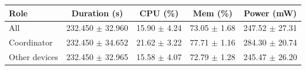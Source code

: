 \begin{tabular}{lcccc}
\hline
\textbf{Role} & \textbf{Duration (s)} & \textbf{CPU (\%)} & \textbf{Mem (\%)} & \textbf{Power (mW)} \\
\hline
All & 232.450 $\pm$ 32.960 & 15.90 $\pm$ 4.24 & 73.05 $\pm$ 1.68 & 247.52 $\pm$ 27.31 \\
Coordinator & 232.450 $\pm$ 34.652 & 21.62 $\pm$ 3.22 & 77.71 $\pm$ 1.16 & 284.30 $\pm$ 20.74 \\
Other devices & 232.450 $\pm$ 32.965 & 15.58 $\pm$ 4.07 & 72.79 $\pm$ 1.28 & 245.47 $\pm$ 26.20 \\
\hline
\end{tabular}

